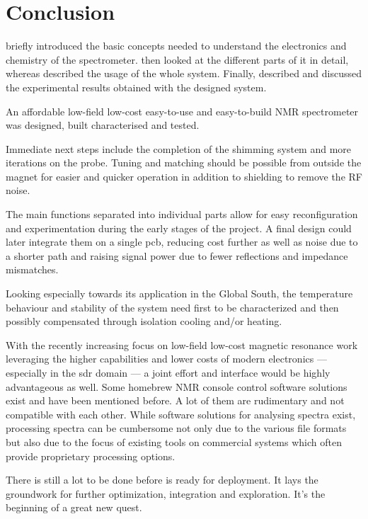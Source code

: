 \chapter{Conclusion}

 briefly introduced the basic concepts needed to understand the electronics and chemistry of the spectrometer.  then looked at the different parts of it in detail, whereas  described the usage of the whole system. Finally,  described and discussed the experimental results obtained with the designed system.

An affordable low-field low-cost easy-to-use and easy-to-build NMR spectrometer was designed, built characterised and tested.

Immediate next steps include the completion of the shimming system and more iterations on the probe. Tuning and matching should be possible from outside the magnet for easier and quicker operation in addition to shielding to remove the RF noise.

The main functions separated into individual parts allow for easy reconfiguration and experimentation during the early stages of the project. A final design could later integrate them on a single \acrshort{pcb}, reducing cost further as well as noise due to a shorter path and raising signal power due to fewer reflections and impedance mismatches.

Looking especially towards its application in the Global South, the temperature behaviour and stability of the system need first to be characterized and then possibly compensated through isolation cooling and/or heating.

With the recently increasing focus on low-field low-cost magnetic resonance work leveraging the higher capabilities and lower costs of modern electronics --- especially in the \acrshort{sdr} domain --- a joint effort and interface would be highly advantageous as well. Some homebrew NMR console control software solutions exist and have been mentioned before. A lot of them are rudimentary and not compatible with each other. While software solutions for analysing spectra exist, processing spectra can be cumbersome not only due to the various file formats but also due to the focus of existing tools on commercial systems which often provide proprietary processing options.

There is still a lot to be done before \magnethical{} is ready for deployment. It lays the groundwork for further optimization, integration and exploration. It's the beginning of a great new quest.